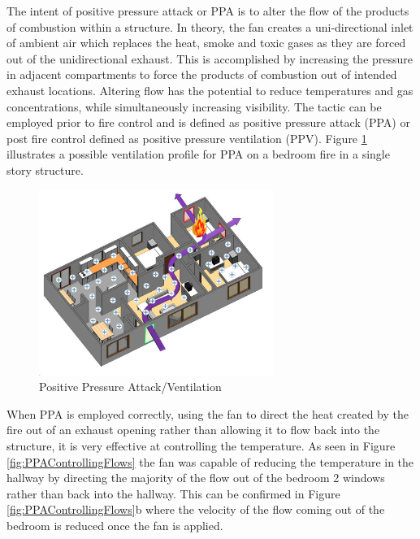 \documentclass{article}
\begin{document}
The intent of positive pressure attack or PPA is to alter the flow of the products of combustion within a structure. In theory, the fan creates a uni-directional inlet of ambient air which replaces the heat, smoke and toxic gases as they are forced out of the unidirectional exhaust. This is accomplished by increasing the pressure in adjacent compartments to force the products of combustion out of intended exhaust locations. Altering flow has the potential to reduce temperatures and gas concentrations, while simultaneously increasing visibility. The tactic can be employed prior to fire control and is defined as positive pressure attack (PPA) or post fire control defined as positive pressure ventilation (PPV).  Figure \ref{fig:PPAConcept} illustrates a possible ventilation profile for PPA on a bedroom fire in a single story structure. 

\begin{figure}[H]
	\centering
	\includegraphics[width = 3in]{0_Images/Tactical_Considerations/Understanding_Basics/Positive_Pressure.jpg}
	\caption{Positive Pressure Attack/Ventilation}
	\label{fig:PPAConcept}
\end{figure}

When PPA is employed correctly, using the fan to direct the heat created by the fire out of an exhaust opening rather than allowing it to flow back into the structure, it is very effective at controlling the temperature. As seen in Figure \ref{fig:PPAControllingFlows} the fan was capable of reducing the temperature in the hallway by directing the majority of the flow out of the bedroom 2 windows rather than back into the hallway. This can be confirmed in Figure \ref{fig:PPAControllingFlows}b where the velocity of the flow coming out of the bedroom is reduced once the fan is applied. 
\end{document}
